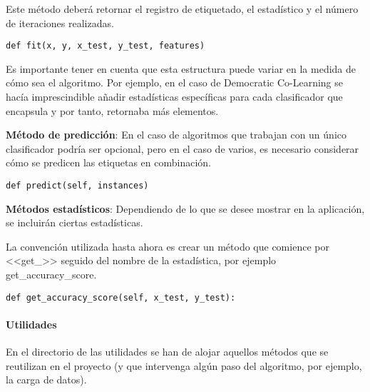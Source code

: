 Este método deberá retornar el registro de etiquetado, el estadístico y el
número de iteraciones realizadas.

\begin{tcolorbox}[colback=cyan!5!white,colframe=cyan!75!black,title=Cabecera fit]
\begin{verbatim}
def fit(x, y, x_test, y_test, features)
\end{verbatim}
\end{tcolorbox}

Es importante tener en cuenta que esta estructura puede variar en la medida de
cómo sea el algoritmo. Por ejemplo, en el caso de Democratic Co-Learning se
hacía imprescindible añadir estadísticas específicas para cada clasificador que
encapsula y por tanto, retornaba más elementos.

\textbf{Método de predicción}: En el caso de algoritmos que trabajan con un único
clasificador podría ser opcional, pero en el caso de varios, es necesario
considerar cómo se predicen las etiquetas en combinación.

\begin{tcolorbox}[colback=cyan!5!white,colframe=cyan!75!black,title=Cabecera predict]
\begin{verbatim}
def predict(self, instances)
\end{verbatim}
\end{tcolorbox}
    

\textbf{Métodos estadísticos}: Dependiendo de lo que se desee mostrar en la
aplicación, se incluirán ciertas estadísticas.

La convención utilizada hasta ahora es crear un método que comience por <<get\_>>
seguido del nombre de la estadística, por ejemplo get\_accuracy\_score.

\begin{tcolorbox}[colback=cyan!5!white,colframe=cyan!75!black,title=Cabecera ejemplo estadística]
\begin{verbatim}
def get_accuracy_score(self, x_test, y_test):
\end{verbatim}
\end{tcolorbox}

\paragraph{Utilidades} En el directorio de las utilidades se han de alojar
aquellos métodos que se reutilizan en el proyecto (y que intervenga algún paso
del algoritmo, por ejemplo, la carga de datos). 

